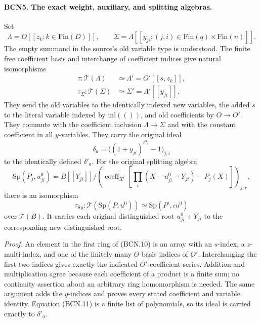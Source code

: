 \paragraph{BCN5. The exact weight, auxiliary, and splitting algebras.}\label{claim:BCN5}
Set
\[
 \Lambda=O[[z_k:k\in\mathrm{Fin}(D)]],\qquad
 \Sigma=\Lambda[[y_{ji}:(j,i)\in\mathrm{Fin}(q)\times
 \mathrm{Fin}(n)]].
\]
The empty summand in the source's old variable type is understood.
The finite free coefficient basis and interchange of coefficient
indices give natural isomorphisms
\[
 \begin{aligned}
 \tau:\mathscr T(\Lambda)&\simeq
 \Lambda'=O'[[s,z_k]],\\
 \tau_\Sigma:\mathscr T(\Sigma)&\simeq
 \Sigma'=\Lambda'[[y_{ji}]] .
 \end{aligned}                                                   \tag{BCN.10}
\]
They send the old variables to the identically indexed new
variables, the added \(s\) to the literal variable indexed by
\(\mathrm{inl}(())\), and old coefficients by \(O\to O'\).
They commute with the coefficient inclusion
\(\Lambda\to\Sigma\) and with the constant coefficient in all
\(y\)-variables.  They carry the original ideal
\[
 \delta_a=\big((1+y_{ji})^{\ell^{a_j}}-1\big)_{j,i}               \tag{BCN.11}
\]
to the identically defined \(\delta'_a\).
For the original splitting algebra
\[
 \mathrm{Sp}(P_j,u^0_{ji})
 =B[[Y_{ji}]]/
 \left(\operatorname{coeff}_{X^r}
   \left[\prod_i(X-u^0_{ji}-Y_{ji})-P_j(X)\right]\right)_{j,r},
                                                               \tag{BCN.12}
\]
there is an isomorphism
\[
 \tau_{\mathrm{Sp}}:\mathscr T(\mathrm{Sp}(P,u^0))
 \simeq \mathrm{Sp}(P^\iota,\iota u^0)                         \tag{BCN.13}
\]
over \(\mathscr T(B)\).  It carries each original distinguished
root \(u^0_{ji}+Y_{ji}\) to the corresponding new distinguished root.

\emph{Proof.}
An element in the first ring of (BCN.10) is an array with an
\(s\)-index, a \(z\)-multi-index, and one of the finitely many
\(O\)-basis indices of \(O'\).  Interchanging the first two
indices gives exactly the indicated \(O'\)-coefficient series.
Addition and multiplication agree because each coefficient of
a product is a finite sum; no continuity assertion about an
arbitrary ring homomorphism is needed.  The same argument adds
the \(y\)-indices and proves every stated coefficient and
variable identity.  Equation (BCN.11) is a finite list of
polynomials, so its ideal is carried exactly to \(\delta'_a\).

